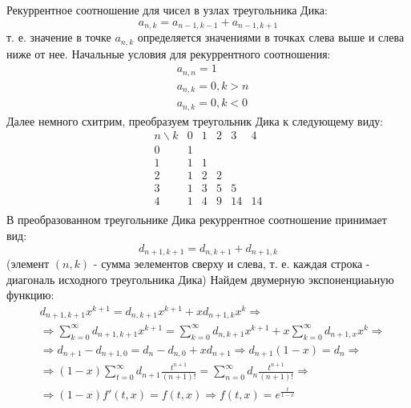 \documentclass[a4paper,12pt]{article}
\begin{document}
\begin{Solution}
Рекуррентное соотношение для чисел в узлах треугольника Дика:
\[
	a_{n,k} = a_{n-1, k-1} + a_{n-1,k+1}
\]
т. е. значение в точке $a_{n,k}$ определяется значениями в точках слева выше и слева ниже от нее.
Начальные условия для рекуррентного соотношения:
\[
	\begin{split}
		& a_{n,n} = 1 \\
		& a_{n,k} = 0, k > n \\
		& a_{n,k} = 0, k < 0
	\end{split}
\]
Далее немного схитрим, преобразуем треугольник Дика к следующему виду:
\[
	\begin{matrix}
		n \backslash k  & 0 & 1 & 2 & 3 & 4 \\
		0 & 1 \\
		1 & 1 & 1 \\
		2 & 1 & 2 & 2 \\
		3 & 1 & 3 & 5 & 5 \\
		4 & 1 & 4 & 9 & 14 & 14 \\
	\end{matrix}
\]
В преобразованном треугольнике Дика рекуррентное соотношение принимает вид:
\[
	d_{n+1,k+1} = d_{n, k+1} + d_{n+1, k}
\]
(элемент $(n,k)$ - сумма эелементов сверху и слева, т. е. каждая строка - диагональ исходного треугольника Дика)
Найдем двумерную экспоненциаьную функцию:
\[
	\begin{split}
		& d_{n+1, k+1} x^{k+1} = d_{n, k+1} x^{k+1} + x d_{n+1, k} x^k \Rightarrow \\
		& \Rightarrow \sum_{k=0}^{\infty} d_{n+1, k+1} x^{k+1} = \sum_{k=0}^{\infty} d_{n, k+1} x^{k+1} + x \sum_{k=0}^{\infty} d_{n+1, x} x^k \Rightarrow \\
		& \Rightarrow d_{n+1} - d_{n+1, 0} = d_{n} - d_{n, 0} + x d_{n+1} \Rightarrow d_{n+1} \left(1 - x\right) = d_{n} \Rightarrow \\
		& \Rightarrow \left(1 - x\right) \sum_{t = 0}^{\infty} d_{n+1} \frac{t^{n+1}}{\left(n+1\right)!} = \sum_{n=0}^{\infty} d_{n} \frac{t^{n+1}}{\left(n+1\right)!} \Rightarrow \\
		& \Rightarrow \left(1 - x\right)f'\left(t,x\right) = f\left(t,x\right) \Rightarrow f\left(t,x\right) = e^{\frac{t}{1-x}}
	\end{split}
\]
\end{Solution}
\end{document}
